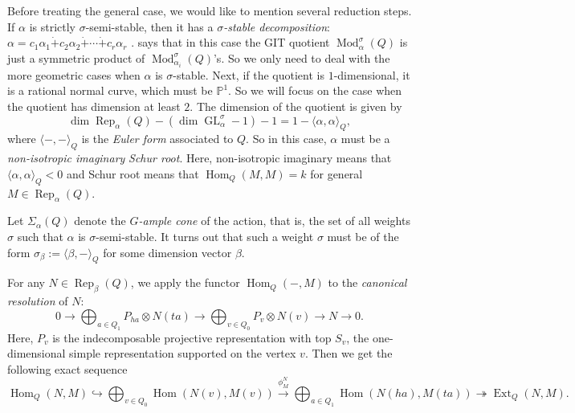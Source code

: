 \documentclass{amsart}
\theoremstyle{definition}
\theoremstyle{remark}
\numberwithin{equation}{section}
\begin{document}
Before treating the general case, we would like to mention several reduction steps. If $\alpha$ is strictly $\sigma$-semi-stable, then it has a {\em $\sigma$-stable decomposition}: $\alpha=c_1\alpha_1\dot{+}c_2\alpha_2\dot{+}\cdots\dot{+}c_r\alpha_r$ \cite[3.2]{DW2}. \cite[Theorem 3.20]{DW2} says that in this case the GIT quotient ${\operatorname{Mod}}_\alpha^\sigma(Q)$ is just a symmetric product of ${\operatorname{Mod}}_{\alpha_i}^\sigma(Q)$'s. So we only need to deal with the more geometric cases when $\alpha$ is $\sigma$-stable. Next, if the quotient is $1$-dimensional, it is a rational normal curve, which must be ${\mathbb{{P}}}^1$. So we will focus on the case when the quotient has dimension at least $2$. The dimension of the quotient is given by
$$\dim{\operatorname{Rep}}_\alpha(Q)-(\dim{\operatorname{GL}}_\alpha^\sigma-1)-1=1-{\langle{\alpha,\alpha}\rangle}_Q,$$
where ${\langle{-,-}\rangle}_Q$ is the {\em Euler form} associated to $Q$. So in this case, $\alpha$ must be a {\em non-isotropic imaginary} {\em Schur root}. Here, non-isotropic imaginary means that ${\langle{\alpha,\alpha}\rangle}_Q<0$ and Schur root means that ${\operatorname{Hom}}_Q(M,M)=k$ for general $M\in{\operatorname{Rep}}_\alpha(Q)$.

Let $\Sigma_\alpha(Q)$ denote the {\em $G$-ample cone} of the action, that is, the set of all weights $\sigma$ such that $\alpha$ is $\sigma$-semi-stable. It turns out that such a weight $\sigma$ must be of the form $\sigma_\beta:={\langle{\beta,-}\rangle}_Q$ for some dimension vector $\beta$.

For any $N\in{\operatorname{Rep}}_{\beta}(Q)$, we apply the functor ${\operatorname{Hom}}_Q(-,M)$ to the {\em canonical resolution} of $N$:
\begin{equation}\label{eq:canproj} 0\xrightarrow{}\bigoplus_{a\in Q_1}P_{ha}\otimes N(ta)\xrightarrow{}\bigoplus_{v\in Q_0}P_v\otimes N(v)\xrightarrow{}N\to 0.\end{equation}
Here, $P_v$ is the indecomposable projective representation with top $S_v$, the one-dimensional simple representation supported on the vertex $v$.
Then we get the following exact sequence
\begin{equation} \label{eq:canseq} {\operatorname{Hom}}_Q(N,M)\hookrightarrow\bigoplus_{v\in Q_0}{\operatorname{Hom}}(N(v),M(v))\xrightarrow{\phi_M^N}\bigoplus_{a\in Q_1}{\operatorname{Hom}}(N(ha),M(ta))\twoheadrightarrow{\operatorname{Ext}}_Q(N,M).\end{equation}
\end{document}
